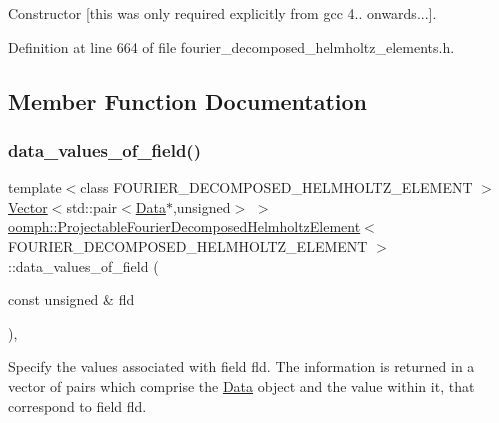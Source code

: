 Constructor \mbox{[}this was only required explicitly from gcc 4.. onwards...\mbox{]}. 



Definition at line 664 of file fourier\+\_\+decomposed\+\_\+helmholtz\+\_\+elements.\+h.



\subsection{Member Function Documentation}
\mbox{\label{classoomph_1_1ProjectableFourierDecomposedHelmholtzElement_a0644ce309555150976c0e5e16ea2dd1f}} 
\subsubsection{\texorpdfstring{data\+\_\+values\+\_\+of\+\_\+field()}{data\_values\_of\_field()}}
{\footnotesize\ttfamily template$<$class F\+O\+U\+R\+I\+E\+R\+\_\+\+D\+E\+C\+O\+M\+P\+O\+S\+E\+D\+\_\+\+H\+E\+L\+M\+H\+O\+L\+T\+Z\+\_\+\+E\+L\+E\+M\+E\+NT $>$ \\
\hyperlink{classoomph_1_1Vector}{Vector}$<$std\+::pair$<$\hyperlink{classoomph_1_1Data}{Data}$\ast$,unsigned$>$ $>$ \hyperlink{classoomph_1_1ProjectableFourierDecomposedHelmholtzElement}{oomph\+::\+Projectable\+Fourier\+Decomposed\+Helmholtz\+Element}$<$ F\+O\+U\+R\+I\+E\+R\+\_\+\+D\+E\+C\+O\+M\+P\+O\+S\+E\+D\+\_\+\+H\+E\+L\+M\+H\+O\+L\+T\+Z\+\_\+\+E\+L\+E\+M\+E\+NT $>$\+::data\+\_\+values\+\_\+of\+\_\+field (\begin{DoxyParamCaption}\item[{const unsigned \&}]{fld }\end{DoxyParamCaption})\hspace{0.3cm}{\ttfamily [inline]}, {\ttfamily [virtual]}}



Specify the values associated with field fld. The information is returned in a vector of pairs which comprise the \hyperlink{classoomph_1_1Data}{Data} object and the value within it, that correspond to field fld. 



